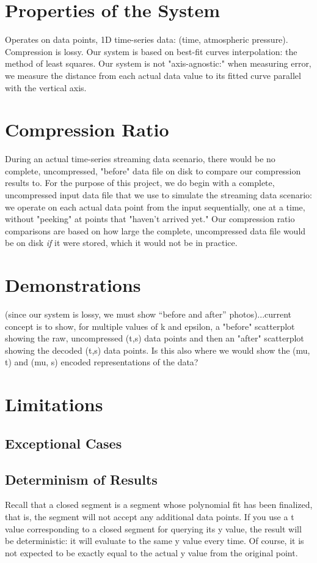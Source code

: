 \documentclass{article}
\begin{document}
\section{Properties of the System}
Operates on data points, 1D time-series data: (time, atmospheric pressure).
Compression is lossy.
Our system is based on best-fit curves interpolation: the method of least squares.
Our system is not "axis-agnostic:" when measuring error, we measure the distance from each actual data value to its fitted curve parallel with the vertical axis.

\section{Compression Ratio}
During an actual time-series streaming data scenario, there would be no complete, uncompressed, "before" data file on disk to compare our compression results to. For the purpose of this project, we do begin with a complete, uncompressed input data file that we use to simulate the streaming data scenario: we operate on each actual data point from the input sequentially, one at a time, without "peeking" at points that "haven't arrived yet." Our compression ratio comparisons are based on how large the complete, uncompressed data file would be on disk \textit{if} it were stored, which it would not be in practice.


\section{Demonstrations}
(since our system is lossy, we must show “before and after” photos)...current concept is to show, for multiple values of k and epsilon, a "before" scatterplot showing the raw, uncompressed (t,s) data points and then an "after" scatterplot showing the decoded (t,s) data points. Is this also where we would show the (mu, t) and (mu, s) encoded representations of the data?

\section{Limitations}

\subsection{Exceptional Cases}

\subsection{Determinism of Results}
Recall that a closed segment is a segment whose polynomial fit has been finalized, that is, the segment will not accept any additional data points. If you use a t value corresponding to a closed segment for querying its y value, the result will be deterministic: it will evaluate to the same y value every time. Of course, it is not expected to be exactly equal to the actual y value from the original point.
\end{document}
